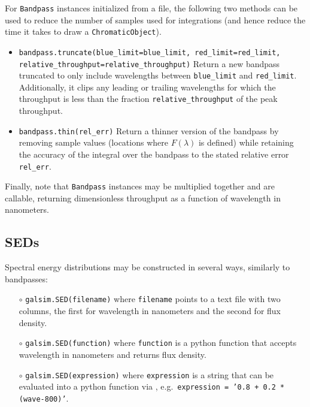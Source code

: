 \documentclass[preprint,11pt]{../../devel/modules/aastex}
\begin{document}
For \texttt{Bandpass} instances initialized from a file, the following two methods can be used to
reduce the number of samples used for integrations (and hence reduce the time it takes to draw
a \texttt{ChromaticObject}).
\begin{itemize}
\item {\tt bandpass.truncate(blue\_limit=blue\_limit, red\_limit=red\_limit, \newline
                             \phantom{bandpass.truncate(}relative\_throughput=relative\_throughput)}\newline
  Return a new bandpass truncated to only include wavelengths between \texttt{blue\_limit} and \texttt{red\_limit}.
  Additionally, it clips any leading or trailing wavelengths for which the throughput is less than
  the fraction \texttt{relative\_throughput} of the peak throughput.
\item {\tt bandpass.thin(rel\_err)}\newline
 Return a thinner version of the bandpass by removing sample values (locations where $F(\lambda)$ is defined) while retaining the
accuracy of the integral over the bandpass to the stated relative error \texttt{rel\_err}.
\end{itemize}

Finally, note that \texttt{Bandpass} instances may be multiplied
together and are callable, returning dimensionless throughput as a
function of wavelength in nanometers.

\subsection{SEDs}
Spectral energy distributions may be constructed in several ways, similarly to bandpasses:
\begin{itemize}
\item[$\circ$] {\tt galsim.SED(filename)} \newline where \texttt{filename} points to a
  text file with two columns, the first for wavelength in nanometers and the second for flux
  density.
\item[$\circ$] {\tt galsim.SED(function)} \newline where \texttt{function} is a python
  function that accepts wavelength in nanometers and returns flux density.
\item[$\circ$] {\tt galsim.SED(expression)} \newline where \texttt{expression} is a string
  that can be evaluated into a python function via ,
  \newline e.g.\ {\tt expression = '0.8 + 0.2 * (wave-800)'}.
\end{itemize}
\end{document}
